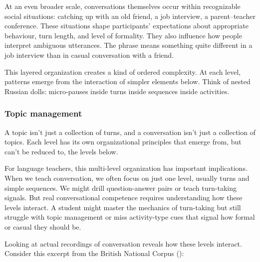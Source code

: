 At an even broader scale, conversations themselves occur within recognizable social situations: catching up with an old friend, a job interview, a parent--teacher conference. These situations shape participants' expectations about appropriate behaviour, turn length, and level of formality. They also influence how people interpret ambiguous utterances. The phrase  means something quite different in a job interview than in casual conversation with a friend.

This layered organization creates a kind of ordered complexity. At each level, patterns emerge from the interaction of simpler elements below. Think of nested Russian dolls: micro-pauses inside turns inside sequences inside activities.

\subsubsection{Topic management}\label{sssec:topic-man}

A topic isn't just a collection of turns, and a conversation isn't just a collection of topics. Each level has its own organizational principles that emerge from, but can't be reduced to, the levels below.

For language teachers, this multi-level organization has important implications. When we teach conversation, we often focus on just one level, usually turns and simple sequences. We might drill question-answer pairs or teach turn-taking signals. But real conversational competence requires understanding how these levels interact. A student might master the mechanics of turn-taking but still struggle with topic management or miss activity-type cues that signal how formal or casual they should be.

Looking at actual recordings of conversation reveals how these levels interact. Consider this excerpt from the British National Corpus (\citeyear{BNC_KC8}):

